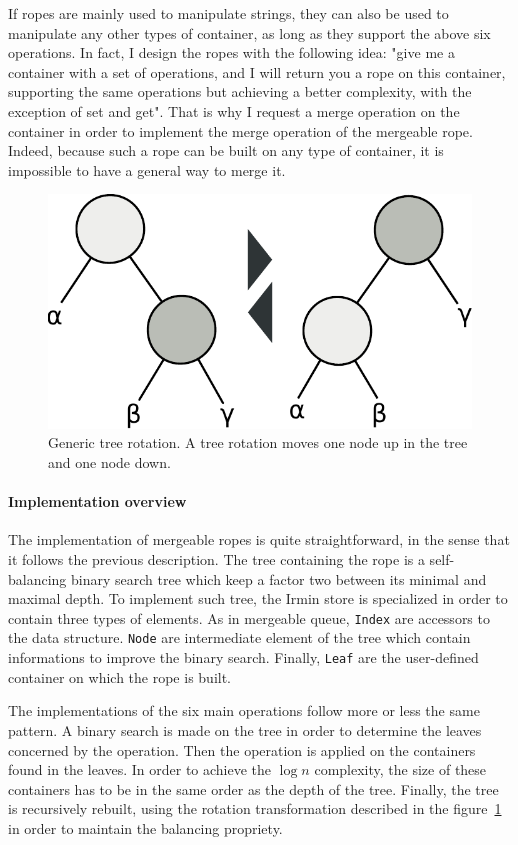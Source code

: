 \documentclass{article}
\renewcommand{\-}{\hyp}
\newcommand{\irmin}{Irmin\xspace}
\newcommand{\code}[1]{\texttt{#1}}
\begin{document}
If ropes are mainly used to manipulate strings, they can also be used to manipulate any other types of container, as long as they support the above six operations.
In fact, I design the ropes with the following idea:
"give me a container with a set of operations, and I will return you a rope on this container, supporting the same operations but achieving a better complexity, with the exception of set and get".
That is why I request a merge operation on the container in order to implement the merge operation of the mergeable rope.
Indeed, because such a rope can be built on any type of container, it is impossible to have a general way to merge it.

\begin{figure}
\centering
\includegraphics[scale=0.6]{rotations.pdf}
\caption{Generic tree rotation. A tree rotation moves one node up in the tree and one node down.}
\label{rotation}
\end{figure}

\paragraph{Implementation overview}
The implementation of mergeable ropes is quite straightforward, in the sense that it follows the previous description.
The tree containing the rope is a self-balancing binary search tree which keep a factor two between its minimal and maximal depth.
To implement such tree, the \irmin store is specialized in order to contain three types of elements.
As in mergeable queue, \code{Index} are accessors to the data structure.
\code{Node} are intermediate element of the tree which contain informations to improve the binary search.
Finally, \code{Leaf} are the user-defined container on which the rope is built.

The implementations of the six main operations follow more or less the same pattern.
A binary search is made on the tree in order to determine the leaves concerned by the operation.
Then the operation is applied on the containers found in the leaves.
In order to achieve the $\log n$ complexity, the size of these containers has to be in the same order as the depth of the tree.
Finally, the tree is recursively rebuilt, using the rotation transformation described in the figure~\ref{rotation} in order to maintain the balancing propriety.
\end{document}
